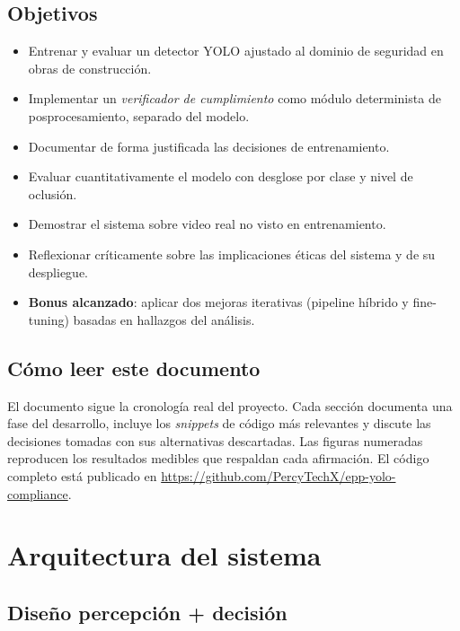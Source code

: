 \documentclass[11pt,a4paper]{article}
\begin{document}
\subsection{Objetivos}

\begin{itemize}
    \item Entrenar y evaluar un detector YOLO ajustado al dominio de
    seguridad en obras de construcción.
    \item Implementar un \textit{verificador de cumplimiento} como
    módulo determinista de posprocesamiento, separado del modelo.
    \item Documentar de forma justificada las decisiones de entrenamiento.
    \item Evaluar cuantitativamente el modelo con desglose por clase y
    nivel de oclusión.
    \item Demostrar el sistema sobre video real no visto en entrenamiento.
    \item Reflexionar críticamente sobre las implicaciones éticas del
    sistema y de su despliegue.
    \item \textbf{Bonus alcanzado}: aplicar dos mejoras iterativas
    (pipeline híbrido y fine-tuning) basadas en hallazgos del análisis.
\end{itemize}

\subsection{Cómo leer este documento}

El documento sigue la cronología real del proyecto. Cada sección
documenta una fase del desarrollo, incluye los \textit{snippets} de
código más relevantes y discute las decisiones tomadas con sus
alternativas descartadas. Las figuras numeradas reproducen los resultados
medibles que respaldan cada afirmación. El código completo está
publicado en \url{https://github.com/PercyTechX/epp-yolo-compliance}.

\section{Arquitectura del sistema}

\subsection{Diseño percepción + decisión}
\end{document}
